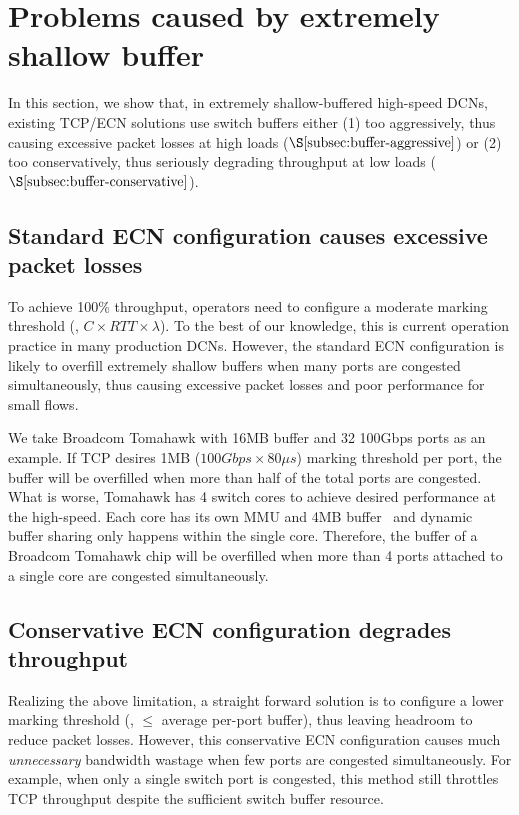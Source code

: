 \section{Problems caused by extremely shallow buffer}\label{sec:problem}
In this section, we show that, in extremely shallow-buffered high-speed DCNs, existing TCP/ECN solutions use switch buffers either (1) too aggressively, thus causing excessive packet losses at high loads ($\S\ref{subsec:buffer-aggressive}$) or (2) too conservatively, thus seriously degrading throughput at low loads ($\S\ref{subsec:buffer-conservative}$).

\subsection{Standard ECN configuration causes excessive packet losses}\label{subsec:buffer-aggressive}
To achieve 100\% throughput, operators need to configure a moderate marking threshold (\eg, $C\times RTT \times \lambda$). To the best of our knowledge, this is current operation practice in many production DCNs. However, the standard ECN configuration is likely to overfill extremely shallow buffers when many ports are congested simultaneously, thus causing excessive packet losses and poor performance for small flows.

We take Broadcom Tomahawk with 16MB buffer and 32 100Gbps ports as an example. If TCP desires 1MB ($100Gbps\times 80\mu s$) marking threshold per port, the buffer will be overfilled when more than half of the total ports are congested. What is worse, Tomahawk has 4 switch cores to achieve desired performance at the high-speed. Each core has its own MMU and 4MB buffer~\cite{tomahawk_buffer1,tomahawk_buffer2} and dynamic buffer sharing only happens within the single core. Therefore, the buffer of a Broadcom Tomahawk chip will be overfilled when more than 4 ports attached to a single core are congested simultaneously.

\subsection{Conservative ECN configuration degrades throughput}\label{subsec:buffer-conservative}
Realizing the above limitation, a straight forward solution is to configure a lower marking threshold (\eg, $\leq$ average per-port buffer), thus leaving headroom to reduce packet losses. However, this conservative ECN configuration causes much \emph{unnecessary} bandwidth wastage when few ports are congested simultaneously. For example, when only a single switch port is congested, this method still throttles TCP throughput despite the sufficient switch buffer resource.




